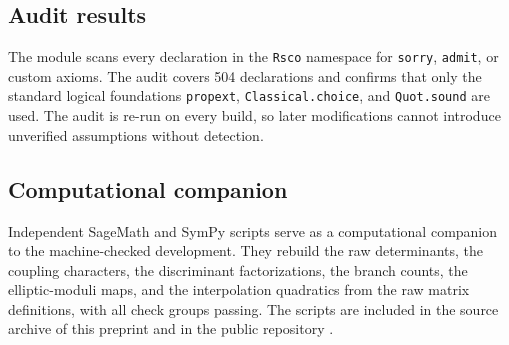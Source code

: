 \documentclass[11pt,reqno]{amsart}
\theoremstyle{remark}
\begin{document}
\subsection{Audit results}

The  module scans every declaration in the
\texttt{Rsco} namespace for \texttt{sorry}, \texttt{admit}, or custom
axioms.  The audit covers 504 declarations and confirms that only the
standard logical foundations \texttt{propext}, \texttt{Classical.choice},
and \texttt{Quot.sound} are used.  The audit is re-run on every build, so
later modifications cannot introduce unverified assumptions without
detection.

\subsection{Computational companion}

Independent SageMath and SymPy scripts serve as a computational companion
to the machine-checked development.  They rebuild the raw determinants,
the coupling characters, the discriminant factorizations, the branch
counts, the elliptic-moduli maps, and the interpolation quadratics from
the raw matrix definitions, with all check groups passing.  The scripts
are included in the source archive of this preprint and in the public
repository \cite{leanformalizations}.
\end{document}
